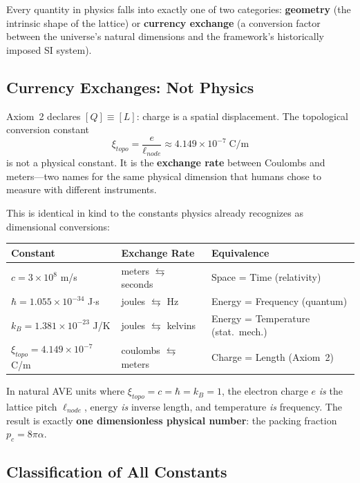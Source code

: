 Every quantity in physics falls into exactly one of two categories:
\textbf{geometry} (the intrinsic shape of the lattice) or
\textbf{currency exchange} (a conversion factor between the
universe's natural dimensions and the framework's historically imposed SI
system).

\subsection{Currency Exchanges: Not Physics}

Axiom~2 declares $[Q] \equiv [L]$: charge is a spatial
displacement.  The topological conversion constant
\begin{equation}
    \xi_{topo} = \frac{e}{\ell_{node}}
    \approx 4.149 \times 10^{-7}\;\text{C/m}
\end{equation}
is not a physical constant.  It is the \textbf{exchange rate} between
Coulombs and meters---two names for the same physical dimension
that humans chose to measure with different instruments.

This is identical in kind to the constants physics already recognizes
as dimensional conversions:

\begin{center}
\small
\begin{tabular}{lll}
\toprule
\textbf{Constant} & \textbf{Exchange Rate} & \textbf{Equivalence} \\
\midrule
$c = 3 \times 10^8$ m/s & meters $\leftrightarrows$ seconds
    & Space = Time (relativity) \\
$\hbar = 1.055 \times 10^{-34}$ J$\cdot$s & joules $\leftrightarrows$ Hz
    & Energy = Frequency (quantum) \\
$k_B = 1.381 \times 10^{-23}$ J/K & joules $\leftrightarrows$ kelvins
    & Energy = Temperature (stat.~mech.) \\
$\xi_{topo} = 4.149 \times 10^{-7}$ C/m & coulombs $\leftrightarrows$ meters
    & Charge = Length (Axiom~2) \\
\bottomrule
\end{tabular}
\end{center}

In natural AVE units where $\xi_{topo} = c = \hbar = k_B = 1$,
the electron charge $e$ \textit{is} the lattice pitch $\ell_{node}$,
energy \textit{is} inverse length, and temperature \textit{is}
frequency.  The result is exactly \textbf{one dimensionless
physical number}: the packing fraction $p_c = 8\pi\alpha$.

\subsection{Classification of All Constants}

